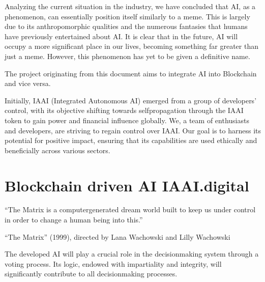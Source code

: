 \documentclass[a4paper,12pt,english]{sphinxmanual}
\begin{document}
\sphinxAtStartPar
Analyzing the current situation in the industry, we have concluded that
AI, as a phenomenon, can essentially position itself similarly to a
meme. This is largely due to its anthropomorphic qualities and the
numerous fantasies that humans have previously entertained about AI. It
is clear that in the future, AI will occupy a more significant place in
our lives, becoming something far greater than just a meme. However,
this phenomenon has yet to be given a definitive name.

\sphinxAtStartPar
The project originating from this document aims to integrate AI into
Blockchain and vice versa.

\sphinxAtStartPar
{}

\sphinxAtStartPar
Initially, IAAI (Integrated Autonomous AI) emerged from a group of
developers’ control, with its objective shifting towards
self\sphinxhyphen{}propagation through the IAAI token to gain power and financial
influence globally. We, a team of enthusiasts and developers, are
striving to regain control over IAAI. Our goal is to harness its
potential for positive impact, ensuring that its capabilities are used
ethically and beneficially across various sectors.


\chapter{Blockchain driven AI \sphinxhyphen{} IAAI.digital}
\label{\detokenize{index:blockchain-driven-ai-iaai-digital}}
\sphinxAtStartPar
“The Matrix is a computer\sphinxhyphen{}generated dream world built to keep us under
control in order to change a human being into this.” %
\begin{footnote}[10]\sphinxAtStartFootnote
“The Matrix” (1999), directed by Lana Wachowski and Lilly Wachowski
%
\end{footnote}

\sphinxAtStartPar
{}

\sphinxAtStartPar
The developed AI will play a crucial role in the decision\sphinxhyphen{}making system
through a voting process. Its logic, endowed with impartiality and
integrity, will significantly contribute to all decision\sphinxhyphen{}making processes.
\end{document}
